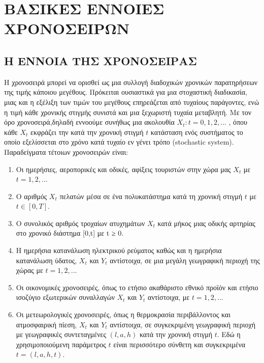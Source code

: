 
\chapter{ΒΑΣΙΚΕΣ ΕΝΝΟΙΕΣ ΧΡΟΝΟΣΕΙΡΩΝ}



\section{Η ΕΝΝΟΙΑ ΤΗΣ ΧΡΟΝΟΣΕΙΡΑΣ}
 Η χρονοσειρά μπορεί να ορισθεί ως μια συλλογή διαδοχικών χρονικών
παρατηρήσεων της τιμής κάποιου μεγέθους. Πρόκειται ουσιαστικά για μια στοχαστική
διαδικασία, μιας και η εξέλιξη των τιμών του μεγέθους επηρεάζεται από τυχαίους
παράγοντες, ενώ η τιμή κάθε χρονικής στιγμής συνιστά και μια ξεχωριστή τυχαία
μεταβλητή. Με τον όρο χρονοσειρά,δηλαδή εννοούμε συνήθως μια ακολουθία ${ X_t : t = 0,1, 2,\ldots }$ , όπου
κάθε $ X_t $ εκφράζει την κατά την χρονική στιγμή $ t $ κατάσταση ενός συστήματος το
οποίο εξελίσσεται στο χρόνο κατά τυχαίο εν γένει τρόπο (stochastic system).\\ 
Παραδείγματα τέτοιων χρονοσειρών είναι: \\
\begin{enumerate}


\item Οι ημερήσιες, αεροπορικές και οδικές, αφίξεις τουριστών στην χώρα μας $ X_t $ με
$t = 1, 2,\ldots $
\item Ο αριθμός $ X_t $ πελατών μέσα σε ένα πολυκατάστημα κατά τη χρονική στιγμή
$ t $ με $ t \in [0, Τ ] $.
\item Ο συνολικός αριθμός τροχαίων ατυχημάτων $ X_t $ κατά μήκος μιας οδικής
αρτηρίας στο χρονικό διάστημα [0,t] με t ≥ 0.
\item Η ημερήσια κατανάλωση ηλεκτρικού ρεύματος καθώς και η ημερήσια
κατανάλωση ύδατος, $ X_t $ και $ Y_t $ αντίστοιχα, σε μια μεγάλη γεωγραφική περιοχή
της χώρας με $ t = 1, 2,\ldots $

\item Οι οικονομικές χρονοσειρές, όπως το ετήσιο ακαθάριστο εθνικό προϊόν και
ετήσιο ισοζύγιο εξωτερικών συναλλαγών $ X_t $ και $ Y_t $ αντίστοιχα, με $ t = 1, 2,\ldots $
\item Οι μετεωρολογικές χρονοσειρές, όπως η θερμοκρασία περιβάλλοντος και
ατμοσφαιρική πίεση, $ X_t $ και $ Y_t $ αντίστοιχα, σε συγκεκριμένη γεωγραφική
περιοχή με γεωγραφικές συντεταγμένες $ ( l , a , h ) $ κατά την χρονική στιγμή $ t $.
Εδώ η χρησιμοποιούμενη παράμετρος $ t $ είναι περισσότερο σύνθετη και
συγκεκριμένα $ t = ( l , a , h , t ) $.
\end{enumerate}

